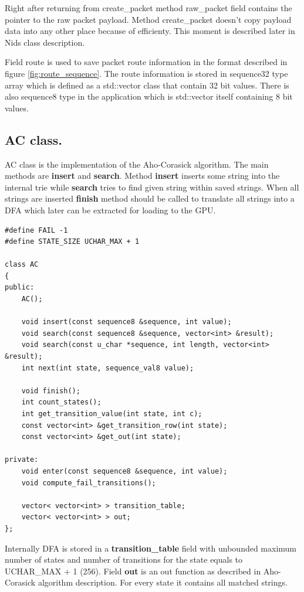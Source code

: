 \documentclass[thesis=M,english]{FITthesis}[2011/07/15]
\begin{document}
Right after returning from create\_packet method raw\_packet field contains the pointer to the raw packet payload. Method create\_packet doesn't copy payload data into any other place because of efficienty. This moment is described later in Nids class description.

Field route is used to save packet route information in the format described in figure \ref{fig:route_sequence}. The route information is stored in sequence32 type array which is defined as a std::vector class that contain 32 bit values. There is also sequence8 type in the application which is std::vector itself containing 8 bit values.

\subsection{AC class.}
AC class is the implementation of the Aho-Corasick algorithm. The main methods are \textbf{insert} and \textbf{search}. Method \textbf{insert} inserts some string into the internal trie while \textbf{search} tries to find given string within saved strings. When all strings are inserted \textbf{finish} method should be called to translate all strings into a DFA which later can be extracted for loading to the GPU. 

\begin{lstlisting}
#define FAIL -1
#define STATE_SIZE UCHAR_MAX + 1

class AC
{
public:
    AC();

    void insert(const sequence8 &sequence, int value);
    void search(const sequence8 &sequence, vector<int> &result);
    void search(const u_char *sequence, int length, vector<int> &result);
    int next(int state, sequence_val8 value);

    void finish();
    int count_states();
    int get_transition_value(int state, int c);
    const vector<int> &get_transition_row(int state);
    const vector<int> &get_out(int state);

private:
    void enter(const sequence8 &sequence, int value);
    void compute_fail_transitions();

    vector< vector<int> > transition_table;
    vector< vector<int> > out;
};
\end{lstlisting}

Internally DFA is stored in a \textbf{transition\_table} field with unbounded maximum number of states and number of transitions for the state equals to UCHAR\_MAX + 1 (256). Field \textbf{out} is an out function as described in Aho-Corasick algorithm description. For every state it contains all matched strings.
\end{document}
